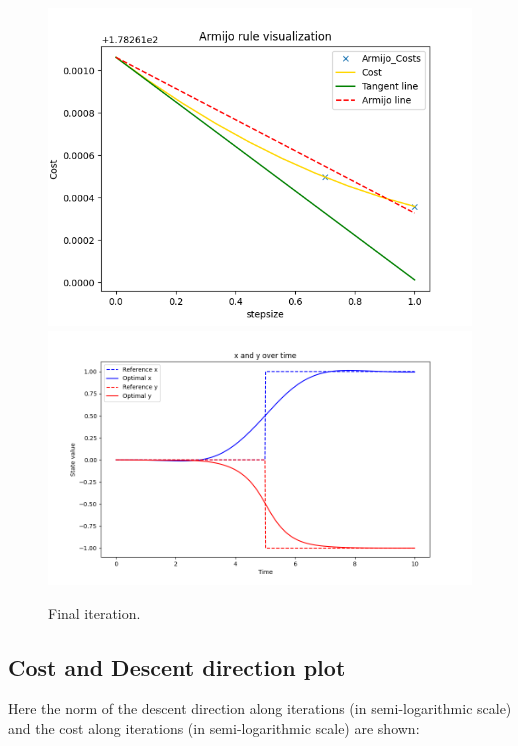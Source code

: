 \begin{figure}[H]
  \centering
  \includegraphics[width=1\textwidth]{pictures/arm_it_10.png}\hfill\\
  \includegraphics[width=1\textwidth]{pictures/new_it_10.png}\hfill
  \caption{Final iteration.}
\end{figure}

\subsection{Cost and Descent direction plot}
 Here the norm of the descent direction along iterations (in semi-logarithmic scale) and the cost along iterations (in semi-logarithmic scale) are shown: 
 
